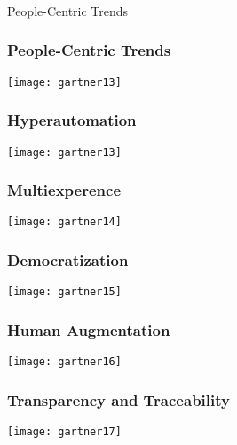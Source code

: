 \begin{frame}[fragile]\frametitle{}
\begin{center}
{\Large People-Centric Trends}
\end{center}
\end{frame}

\begin{frame}[fragile]\frametitle{People-Centric Trends}
\begin{center}
\texttt{[image: gartner13]}
\end{center}
\end{frame}

\begin{frame}[fragile]\frametitle{Hyperautomation}
\begin{center}
\texttt{[image: gartner13]}
\end{center}
\end{frame}

\begin{frame}[fragile]\frametitle{Multiexperence}
\begin{center}
\texttt{[image: gartner14]}
\end{center}
\end{frame}

\begin{frame}[fragile]\frametitle{Democratization}
\begin{center}
\texttt{[image: gartner15]}
\end{center}
\end{frame}


\begin{frame}[fragile]\frametitle{Human Augmentation}
\begin{center}
\texttt{[image: gartner16]}
\end{center}
\end{frame}

\begin{frame}[fragile]\frametitle{Transparency and Traceability}
\begin{center}
\texttt{[image: gartner17]}
\end{center}
\end{frame}

